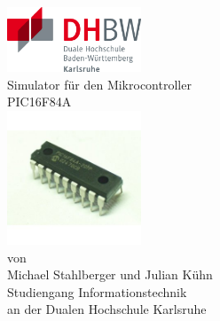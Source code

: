 \documentclass[ a4paper,	%
		11pt,		%
		pdftex,		%
		] {report}	%
\newcommand{\Was}{ PIC16F84A}
\newcommand{\Titel}{Simulator für den Mikrocontroller }
\begin{document}

\begin{singlespace}							%
\begin{titlepage}
\begin{center}								%
\vspace*{-2cm}								%
\hfill\includegraphics[width=4cm]{Bilder/dhbw-logo}\\[2cm] %

{\Huge \Titel}\\[0.5cm]							%
{\Huge \Was}\\[1cm]						%

\includegraphics[width=4cm]{Bilder/Microcontroller.jpg}\\[2cm]

{\large von\\[0.5cm]
{\large Michael Stahlberger und Julian Kühn}\\[0.5cm]

{\large Studiengang Informationstechnik \\
an der Dualen Hochschule Karlsruhe}\\[0.5cm]}

\vfill									%
\end{center}								%

\end{titlepage}
\end{singlespace}								%
\end{document}
